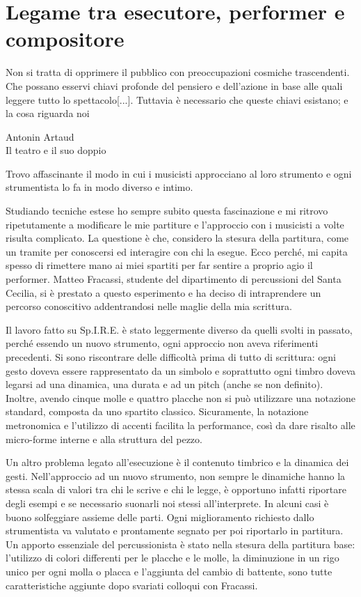 
\section{Legame tra esecutore, performer e \newline compositore}

\epigraph{Non si tratta di opprimere il pubblico con preoccupazioni cosmiche trascendenti. Che possano esservi chiavi profonde del pensiero e dell'azione in base alle quali leggere tutto lo spettacolo[...].
Tuttavia è necessario che queste chiavi esistano; e la cosa riguarda noi}{Antonin Artaud \\ Il teatro e il suo doppio}

Trovo affascinante il modo in cui i musicisti approcciano al loro strumento e ogni strumentista lo fa in modo diverso e intimo. 

Studiando tecniche estese ho sempre subito questa fascinazione e mi ritrovo ripetutamente a modificare le mie partiture e l'approccio con i musicisti a volte risulta complicato. La questione è che, considero la stesura della partitura, come un tramite per conoscersi ed interagire con chi la esegue. Ecco perché, mi capita spesso di rimettere mano ai miei spartiti per far sentire a proprio agio il performer. Matteo Fracassi, studente del dipartimento di percussioni del Santa Cecilia, si è prestato a questo esperimento e ha deciso di intraprendere un percorso conoscitivo addentrandosi nelle maglie della mia scrittura.

Il lavoro fatto su Sp.I.R.E. è stato leggermente diverso da quelli svolti in passato, perché essendo un nuovo strumento, ogni approccio non aveva riferimenti precedenti. Si sono riscontrare delle difficoltà prima di tutto di scrittura: ogni gesto doveva essere rappresentato da un simbolo e soprattutto ogni timbro doveva legarsi ad una dinamica, una durata e ad un pitch (anche se non definito). Inoltre, avendo cinque molle e quattro placche non si può utilizzare una notazione standard, composta da uno spartito classico. Sicuramente, la notazione metronomica e l'utilizzo di accenti facilita la performance, così da dare risalto alle micro-forme interne e alla struttura del pezzo.

Un altro problema legato all'esecuzione è il contenuto timbrico e la dinamica dei gesti. Nell'approccio ad un nuovo strumento, non sempre le dinamiche hanno la stessa scala di valori tra chi le scrive e chi le legge, è opportuno infatti riportare degli esempi e se necessario suonarli noi stessi all'interprete. In alcuni casi è buono solfeggiare assieme delle parti. Ogni miglioramento richiesto dallo strumentista va valutato e prontamente segnato per poi riportarlo in partitura. Un apporto essenziale del percussionista è stato nella stesura della partitura base: l'utilizzo di colori differenti per le placche e le molle, la diminuzione in un rigo unico per ogni molla o placca e l'aggiunta del cambio di battente, sono tutte caratteristiche aggiunte dopo svariati colloqui con Fracassi. 

